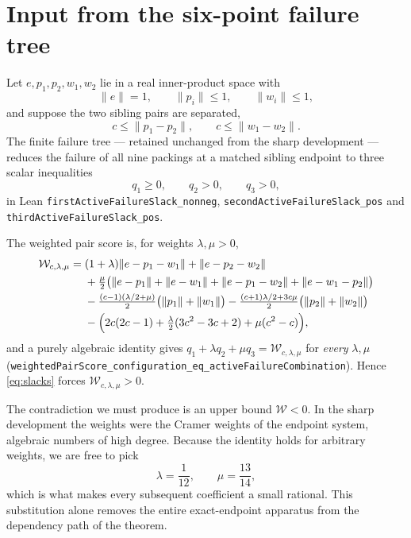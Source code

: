 \documentclass[11pt]{article}
\newcommand{\score}{\mathcal{W}}
\newcommand{\norm}[1]{\lVert #1\rVert}
\begin{document}
\section{Input from the six-point failure tree}

Let $e,p_1,p_2,w_1,w_2$ lie in a real inner-product space with
\[
\norm e=1,\qquad \norm{p_i}\le1,\qquad \norm{w_i}\le1,
\]
and suppose the two sibling pairs are separated,
\begin{equation}
c\le\norm{p_1-p_2},\qquad c\le\norm{w_1-w_2}.
\label{eq:sep}
\end{equation}
The finite failure tree — retained unchanged from the sharp development — reduces the failure of
all nine packings at a matched sibling endpoint to three scalar inequalities
\begin{equation}
q_1\ge0,\qquad q_2>0,\qquad q_3>0,
\label{eq:slacks}
\end{equation}
in Lean \texttt{firstActiveFailureSlack\_nonneg}, \texttt{secondActiveFailureSlack\_pos} and
\texttt{thirdActiveFailureSlack\_pos}.

The weighted pair score is, for weights $\lambda,\mu>0$,
\begin{align*}
\score_{c,\lambda,\mu}
={}&(1+\lambda)\norm{e-p_1-w_1}+\norm{e-p_2-w_2}\\
&+\tfrac\mu2\bigl(\norm{e-p_1}+\norm{e-w_1}+\norm{e-p_1-w_2}+\norm{e-w_1-p_2}\bigr)\\
&-\tfrac{(c-1)(\lambda/2+\mu)}2\bigl(\norm{p_1}+\norm{w_1}\bigr)
-\tfrac{(c+1)\lambda/2+3c\mu}{2}\bigl(\norm{p_2}+\norm{w_2}\bigr)\\
&-\Bigl(2c(2c-1)+\tfrac\lambda2(3c^2-3c+2)+\mu(c^2-c)\Bigr),
\end{align*}
and a purely algebraic identity gives
$q_1+\lambda q_2+\mu q_3=\score_{c,\lambda,\mu}$ for \emph{every} $\lambda,\mu$
(\texttt{weightedPairScore\_configuration\_eq\_activeFailureCombination}). Hence
\eqref{eq:slacks} forces $\score_{c,\lambda,\mu}>0$.

The contradiction we must produce is an upper bound $\score<0$. In the sharp development the
weights were the Cramer weights of the endpoint system, algebraic numbers of high degree. Because
the identity holds for arbitrary weights, we are free to pick
\begin{equation}
\lambda=\frac1{12},\qquad \mu=\frac{13}{14},
\label{eq:weights}
\end{equation}
which is what makes every subsequent coefficient a small rational. This substitution alone removes
the entire exact-endpoint apparatus from the dependency path of the theorem.
\end{document}
